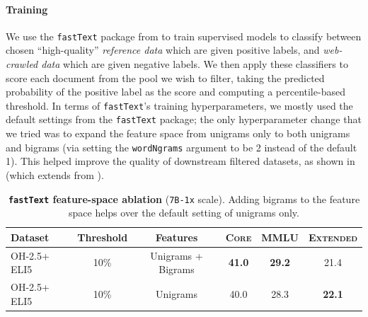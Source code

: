 \documentclass{article}
\newcommand{\oh}{\textsc{OH-2.5}\xspace}
\newcommand{\ltrack}{\texttt{7B-1x}\xspace}
\newcommand{\fasttext}{\texttt{fastText}\xspace}
\newcommand{\lowvar}{\textsc{Core}\xspace}
\newcommand{\aggscore}{\textsc{Extended}\xspace}
\begin{document}
\paragraph{Training} We use the \fasttext package from \citet{joulin2017bag} to train supervised models to classify between chosen ``high-quality'' \textit{reference data} which are given positive labels, and \textit{web-crawled data} which are given negative labels. We then apply these classifiers to score each document from the pool we wish to filter, taking the predicted probability of the positive label as the score and computing a percentile-based threshold. In terms of \fasttext's training hyperparameters, we mostly used the default settings from the \fasttext package; the only hyperparameter change that we tried was to expand the feature space from unigrams only to both unigrams and bigrams (via setting the \texttt{wordNgrams} argument to be 2 instead of the default 1). This helped improve the quality of downstream filtered datasets, as shown in  (which extends  from ).

\begin{table}[h]
\centering
\caption{\textbf{\fasttext feature-space ablation} (\ltrack{} scale). Adding bigrams to the feature space helps over the default setting of unigrams only. }
\label{tab:fasttext_ablations_features}
\begin{tabular}{lccccc}
\toprule
     Dataset & Threshold &  Features &   \lowvar &          MMLU &     \aggscore \\
\midrule
    \oh + ELI5 &      10\% & Unigrams + Bigrams& \textbf{41.0} & \textbf{29.2} &          21.4 \\
     \oh + ELI5 &      10\% &   Unigrams &       40.0 &          28.3 & \textbf{22.1} \\
\bottomrule
\end{tabular}
\end{table}
\end{document}
